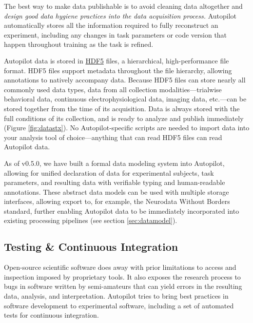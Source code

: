 The best way to make data publishable is to avoid cleaning data altogether and \textit{design good data hygiene practices into the data acquisition process.} Autopilot automatically stores all the information required to fully reconstruct an experiment, including any changes in task parameters or code version that happen throughout training as the task is refined.

Autopilot data is stored in \href{https://support.hdfgroup.org/HDF5/whatishdf5.html}{HDF5} files, a hierarchical, high-performance file format. HDF5 files support metadata throughout the file hierarchy, allowing annotations to natively accompany data. Because HDF5 files can store nearly all commonly used data types, data from all collection modalities---trialwise behavioral data, continuous electrophysiological data, imaging data, etc.---can be stored together from the time of its acquisition. Data is always stored with the full conditions of its collection, and is ready to analyze and publish immediately (Figure \ref{fig:datastx}). No Autopilot-specific scripts are needed to import data into your analysis tool of choice---anything that can read HDF5 files can read Autopilot data. 

As of v0.5.0, we have built a formal data modeling system into Autopilot, allowing for unified declaration of data for experimental subjects, task parameters, and resulting data with verifiable typing and human-readable annotations. These abstract data models can be used with multiple storage interfaces, allowing export to, for example, the Neurodata Without Borders standard\citep{rubelNWBAccessibleData2019}, further enabling Autopilot data to be immediately incorporated into existing processing pipelines (see section \ref{sec:datamodel}).

\subsection{Testing \& Continuous Integration}

Open-source scientific software does away with prior limitations to access and inspection imposed by proprietary tools. It also exposes the research process to bugs in software written by semi-amateurs that can yield errors in the resulting data, analysis, and interpretation\citep{soergelRampantSoftwareErrors2015,eklundClusterFailureWhy2016a,bhandarineupaneCharacterizationLeptazolinesPolar2019,millerScientistNightmareSoftware2006}. Autopilot tries to bring best practices in software development to experimental software, including a set of automated tests for continuous integration. 

